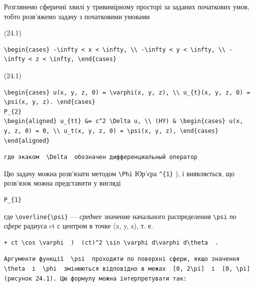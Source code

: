 \documentclass[
  ukrainian,
]{article}
\begin{document}
Розглянемо сферичні хвилі у тривимірному просторі за заданих початкових
умов, тобто розв'яжемо задачу з початковими умовами

(24.1)

\begin{verbatim}
\begin{cases} -\infty < x < \infty, \\ -\infty < y < \infty, \\ -\infty < z < \infty, \end{cases}
\end{verbatim}

(24.1)

\begin{verbatim}
\begin{cases} u(x, y, z, 0) = \varphi(x, y, z), \\ u_{t}(x, y, z, 0) = \psi(x, y, z). \end{cases}
P_{2}
\begin{aligned} u_{tt} &= c^2 \Delta u, \\ (HY) & \begin{cases} u(x, y, z, 0) = 0, \\ u_t(x, y, z, 0) = \psi(x, y, z), \end{cases} \end{aligned}
\end{verbatim}

\begin{verbatim}
где экаком  \Delta  обозначен дифференциальный оператор
\end{verbatim}

Цю задачу можна розв'язати методом \texttt{\textbackslash{}Phi} Юр'єра
\texttt{\^{}\{1\}} ), і виявляється, що розв'язок можна представити у
вигляді

\begin{verbatim}
P_{1}
\end{verbatim}

где \texttt{\textbackslash{}overline\{\textbackslash{}psi\}} ---
\emph{среднее} значение начального распределения
\texttt{\textbackslash{}psi} \emph{по сфере} радиуса ct с центром в
точке (x, y, z), т. е.

\begin{verbatim}
+ ct \cos \varphi  )  (ct)^2 \sin \varphi d\varphi d\theta  .
\end{verbatim}

\begin{verbatim}
Аргументи функції  \psi  проходити по поверхні сфери, якщо значення  \theta  і  \phi  змінюються відповідно в межах  [0, 2\pi]  і  [0, \pi]  (рисунок 24.1). Цю формулу можна інтерпретувати так:
\end{verbatim}
\end{document}
